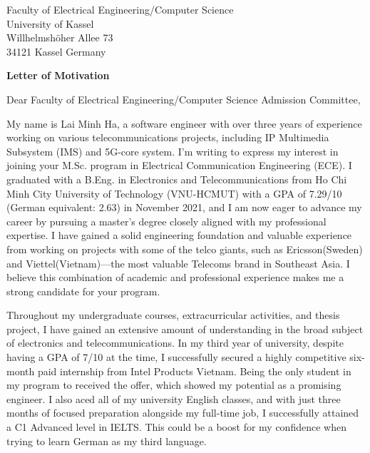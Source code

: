 \documentclass[a4paper,12pt]{letter}
\date{}
\begin{document}
\begin{letter}{
    Faculty of Electrical Engineering/Computer Science
    \\ University of Kassel
    \\ Willhelmshöher Allee 73
    \\ 34121 Kassel Germany
}

\vspace*{-1.5cm}
\begin{center}
    \LARGE \textbf{Letter of Motivation}
\end{center}

\vspace{0.2cm} %

\opening{Dear Faculty of Electrical Engineering/Computer Science Admission Committee,}

My name is Lai Minh Ha, a software engineer with over three years of experience working on various telecommunications projects, including IP Multimedia Subsystem (IMS) and 5G-core system. I'm writing to express my interest in joining your M.Sc. program in Electrical Communication Engineering (ECE). I graduated with a B.Eng. in Electronics and Telecommunications from Ho Chi Minh City University of Technology (VNU-HCMUT) with a GPA of 7.29/10 (German equivalent: 2.63) in November 2021, and I am now eager to advance my career by pursuing a master’s degree closely aligned with my professional expertise. I have gained a solid engineering foundation and valuable experience from working on projects with some of the telco giants, such as Ericsson(Sweden) and Viettel(Vietnam)—the most valuable Telecoms brand in Southeast Asia. I believe this combination of academic and professional experience makes me a strong candidate for your program.

Throughout my undergraduate courses, extracurricular activities, and thesis project, I have gained an extensive amount of understanding in the broad subject of electronics and telecommunications. In my third year of university, despite having a GPA of 7/10 at the time, I successfully secured a highly competitive six-month paid internship from Intel Products Vietnam. Being the only student in my program to received the offer, which showed my potential as a promising engineer. I also aced all of my university English classes, and with just three months of focused preparation alongside my full-time job, I successfully attained a C1 Advanced level in IELTS. This could be a boost for my confidence when trying to learn German as my third language.


\end{letter}
\end{document}
